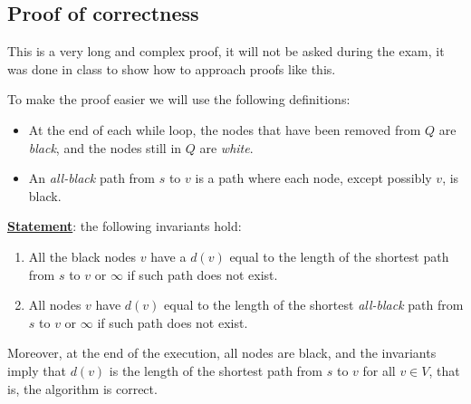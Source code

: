 \documentclass[12pt]{extarticle}
\begin{document}
\subsection{Proof of correctness}

This is a very long and complex proof, it will not be asked during the exam, it was done in class to show how to approach proofs like this.

To make the proof easier we will use the following definitions:
\begin{itemize}
    \item At the end of each while loop, the nodes that have been removed from $Q$ are \textit{black}, and the nodes still in $Q$ are \textit{white}.
    \item An \textit{all-black} path from $s$ to $v$ is a path where each node, except possibly $v$, is black.
\end{itemize}

\textbf{\underline{Statement}}: the following invariants hold:

\begin{enumerate}[label=\roman*.]
    \item All the black nodes $v$ have a $d(v)$ equal to the length of the shortest path from $s$ to $v$ or $\infty$ if such path does not exist.
    \item All nodes $v$ have $d(v)$ equal to the length of the shortest \textit{all-black} path from $s$ to $v$ or $\infty$ if such path does not exist.
\end{enumerate}

Moreover, at the end of the execution, all nodes are black, and the invariants imply that $d(v)$ is the length of the shortest path from $s$ to $v$ for all $v \in V$, that is, the algorithm is correct.
\end{document}
